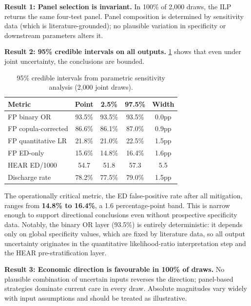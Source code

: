 \documentclass[11pt, oneside]{article}
\begin{document}
\textbf{Result 1: Panel selection is invariant.} In 100\% of 2{,}000 draws, the ILP returns the same four-test panel. Panel composition is determined by sensitivity data (which is literature-grounded); no plausible variation in specificity or downstream parameters alters it.

\textbf{Result 2: 95\% credible intervals on all outputs.} \cref{tab:sa_ci} shows that even under joint uncertainty, the conclusions are bounded.

\begin{table}[h]
\centering
\caption{95\% credible intervals from parametric sensitivity analysis (2{,}000 joint draws).}
\label{tab:sa_ci}
\scriptsize
\setlength{\tabcolsep}{3pt}
\begin{tabular}{@{}lcccc@{}}
\toprule
\textbf{Metric} & \textbf{Point} & \textbf{2.5\%} & \textbf{97.5\%} & \textbf{Width} \\
\midrule
FP binary OR           & 93.5\% & 93.5\% & 93.5\% & 0.0pp \\
FP copula-corrected    & 86.6\% & 86.1\% & 87.0\% & 0.9pp \\
FP quantitative LR     & 21.8\% & 21.0\% & 22.5\% & 1.5pp \\
FP ED-only             & 15.6\% & 14.8\% & 16.4\% & 1.6pp \\
HEAR ED/1000           & 54.7   & 51.8   & 57.3   & 5.5 \\
Discharge rate         & 78.2\% & 77.5\% & 79.0\% & 1.5pp \\
\bottomrule
\end{tabular}
\par{}
\end{table}

The operationally critical metric, the ED false-positive rate after all mitigation, ranges from \textbf{14.8\% to 16.4\%}, a 1.6 percentage-point band. This is narrow enough to support directional conclusions even without prospective specificity data. Notably, the binary OR layer (93.5\%) is entirely deterministic: it depends only on global specificity values, which are fixed by literature data, so all output uncertainty originates in the quantitative likelihood-ratio interpretation step and the HEAR pre-stratification layer.

\textbf{Result 3: Economic direction is favourable in 100\% of draws.} No plausible combination of uncertain inputs reverses the direction; panel-based strategies dominate current care in every draw. Absolute magnitudes vary widely with input assumptions and should be treated as illustrative.
\end{document}
